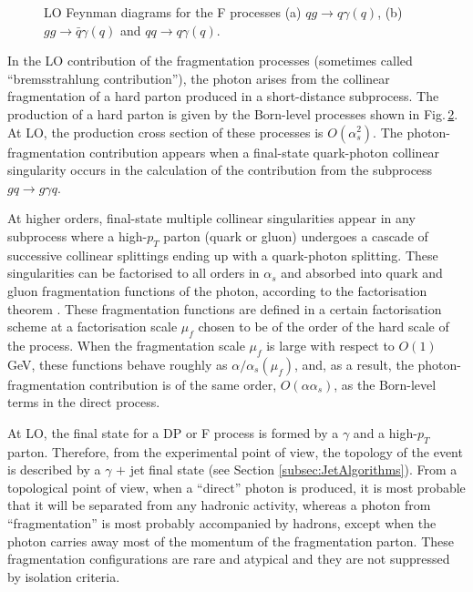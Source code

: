 \documentclass[12pt, twoside]{article}
\numberwithin{equation}{section}
\numberwithin{figure}{section}
\begin{document}
\begin{description}
\begin{figure}[h]
\begin{subfigure}[b]{0.25\textwidth}
            \caption{}
            \label{fig:F_LO_Feynman_3}
        \end{subfigure}
        \captionsetup{width=0.9\textwidth}
        \caption{LO Feynman diagrams for the F processes (a) $q g \rightarrow{} q \gamma (q)$, (b) $g g \rightarrow{} \bar{q} \gamma (q)$ and $q q \rightarrow{} q \gamma (q)$.}
        \label{fig:Fprocesses}
    \end{figure}

    In the LO contribution of the fragmentation processes (sometimes called ``bremsstrahlung contribution''), the photon arises from the collinear fragmentation of a hard parton produced in a short-distance subprocess. The production of a hard parton is given by the Born-level processes shown in Fig.\,\ref{fig:Fprocesses}. At LO, the production cross section of these processes is $O \left( \alpha^{2}_{s} \right)$. The photon-fragmentation contribution appears when a final-state quark-photon collinear singularity occurs in the calculation of the contribution from the subprocess $g q \rightarrow{} g \gamma q$.

    At higher orders, final-state multiple collinear singularities appear in any subprocess where a high-$p_{T}$ parton (quark or gluon) undergoes a cascade of successive collinear splittings ending up with a quark-photon splitting. These singularities can be factorised to all orders in $\alpha_{s}$ and absorbed into quark and gluon fragmentation functions of the photon, according to the factorisation theorem \cite{factorisation}. These fragmentation functions are defined in a certain factorisation scheme at a factorisation scale $\mu_{f}$ chosen to be of the order of the hard scale of the process. When the fragmentation scale $\mu_{f}$ is large with respect to $O \left( 1 \right)$ GeV, these functions behave roughly as $\alpha / \alpha_{s} \left( \mu_{f} \right)$, and, as a result, the photon-fragmentation contribution is of the same order, $O \left( \alpha \alpha_{s} \right)$, as the Born-level terms in the direct process.
\end{description}

At LO, the final state for a DP or F process is formed by a $\gamma$ and a high-$p_{T}$ parton. Therefore, from the experimental point of view, the topology of the event is described by a $\gamma$ $+$ jet final state (see Section \ref{subsec:JetAlgorithms}). From a topological point of view, when a ``direct'' photon is produced, it is most probable that it will be separated from any hadronic activity, whereas a photon from ``fragmentation'' is most probably accompanied by hadrons, except when the photon carries away most of the momentum of the fragmentation parton. These fragmentation configurations are rare and atypical and they are not suppressed by isolation criteria.
\end{document}
